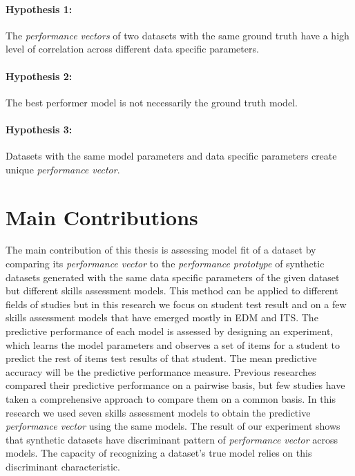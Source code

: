 \paragraph{Hypothesis 1:} The \textit{performance vectors} of two datasets with the same ground truth have a high level of correlation across different data specific parameters. 
\paragraph{Hypothesis 2:} The best performer model is not necessarily the ground truth model.
\paragraph{Hypothesis 3:} Datasets with the same model parameters and data specific parameters create unique \textit{performance vector}. 

\section{Main Contributions}

The main contribution of this thesis is assessing model fit of a dataset by comparing its \textit{performance vector} to the \textit{performance prototype} of synthetic datasets generated with the same data specific parameters of the given dataset but different skills assessment models. This method can be applied to different fields of studies but in this research we focus on student test result and on a few skills assessment models that have emerged mostly in EDM and ITS. The predictive performance of each model is assessed by designing an experiment, which learns the model parameters and observes a set of items for a student to predict the rest of items test results of that student. The mean predictive accuracy will be the predictive performance measure. Previous researches compared their predictive performance on a pairwise basis, but few studies have taken a comprehensive approach to compare them on a common basis. In this research we used seven skills assessment models to obtain the predictive \textit{performance vector} using the same models. The result of our experiment shows that synthetic datasets have discriminant pattern of \textit{performance vector} across models. The capacity of recognizing a dataset’s true model relies on this discriminant characteristic.

